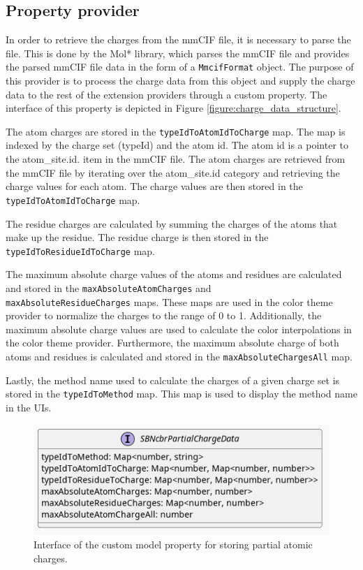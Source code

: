 \documentclass[
  digital,     %
  oneside,     %
  nosansbold,  %
  nocolorbold, %
  lof,         %
  lot,         %
]{fithesis4}
\begin{document}
\subsection{Property provider}
\label{subsection:property_provider}

In order to retrieve the charges from the mmCIF file, it is necessary to parse the file. This is done by the Mol* library, which parses the mmCIF file and provides the parsed mmCIF file data in the form of a \texttt{MmcifFormat} object. The purpose of this provider is to process the charge data from this object and supply the charge data to the rest of the extension providers through a custom property. The interface of this property is depicted in Figure \ref{figure:charge_data_structure}.

The atom charges are stored in the \texttt{typeIdToAtomIdToCharge} map. The map is indexed by the charge set (typeId) and the atom id. The atom id is a pointer to the atom\_site.id. item in the mmCIF file. The atom charges are retrieved from the mmCIF file by iterating over the atom\_site.id category and retrieving the charge values for each atom. The charge values are then stored in the \texttt{typeIdToAtomIdToCharge} map.

The residue charges are calculated by summing the charges of the atoms that make up the residue. The residue charge is then stored in the \texttt{typeIdToResidueIdToCharge} map.

The maximum absolute charge values of the atoms and residues are calculated and stored in the \texttt{maxAbsoluteAtomCharges} and \\
\texttt{maxAbsoluteResidueCharges} maps. These maps are used in the color theme provider to normalize the charges to the range of 0 to 1. Additionally, the maximum absolute charge values are used to calculate the color interpolations in the color theme provider. Furthermore, the maximum absolute charge of both atoms and residues is calculated and stored in the \texttt{maxAbsoluteChargesAll} map.

Lastly, the method name used to calculate the charges of a given charge set is stored in the \texttt{typeIdToMethod} map. This map is used to display the method name in the UIs.

\begin{figure}[htbp]
  \begin{center}
    \includegraphics[width=\textwidth]{out/figures/uml/interface/custom model property interface.png}
  \end{center}
  \caption{Interface of the custom model property for storing partial atomic charges.}
  \label{fig:property_provider_interface}
\end{figure}
\end{document}
